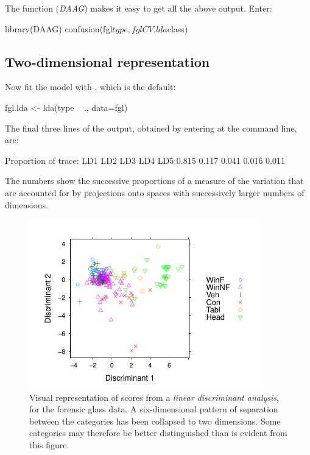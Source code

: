 The function  (\textit{DAAG}) makes it easy to
get all the above output.  Enter:
\begin{Schunk}
\begin{Sinput}
library(DAAG)
confusion(fgl$type, fglCV.lda$class)
\end{Sinput}
\end{Schunk}

\subsection*{Two-dimensional representation}

Now fit the model with , which is the default:
\begin{Schunk}
\begin{Sinput}
fgl.lda <- lda(type ~ ., data=fgl)
\end{Sinput}
\end{Schunk}
The final three lines of the output, obtained by entering
 at the command line, are:
\begin{Schunk}
\begin{Soutput}
Proportion of trace:
  LD1   LD2   LD3   LD4   LD5
0.815 0.117 0.041 0.016 0.011
\end{Soutput}
\end{Schunk}
The numbers 
show the successive proportions of a measure of the
variation that are accounted for by projections onto spaces with
successively larger numbers of dimensions.  


\begin{figure}
\begin{Schunk}


\centerline{\includegraphics[width=0.9\textwidth]{figs/9-fgl-scores2D-1} }

\end{Schunk}
\caption{Visual representation of scores from a
  {\em linear discriminant analysis}, for the forensic glass data.  A
  six-dimensional pattern of separation between the categories has
  been collapsed to two dimensions.  Some categories may therefore
be better distinguished than is evident from this figure.\label{fig:fgl}}
\end{figure}

